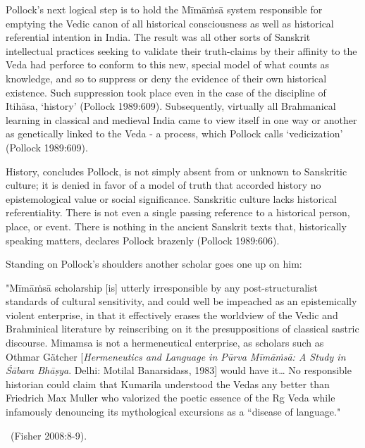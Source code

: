 Pollock’s next logical step is to hold the Mīmāṁsā system responsible for emptying the Vedic canon of all historical consciousness as well as historical referential intention in India. The result was all other sorts of Sanskrit intellectual practices seeking to validate their truth-claims by their affinity to the Veda had perforce to conform to this new, special model of what counts as knowledge, and so to suppress or deny the evidence of their own historical existence. Such suppression took place even in the case of the discipline of Itihāsa, ‘history’ (Pollock 1989:609). Subsequently, virtually all Brahmanical learning in classical and medieval India came to view itself in one way or another as genetically linked to the Veda - a process, which Pollock calls ‘vedicization’ (Pollock 1989:609).

History, concludes Pollock, is not simply absent from or unknown to Sanskritic culture; it is denied in favor of a model of truth that accorded history no epistemological value or social significance. Sanskritic culture lacks historical referentiality. There is not even a single passing reference to a historical person, place, or event. There is nothing in the ancient Sanskrit texts that, historically speaking matters, declares Pollock brazenly (Pollock 1989:606).

Standing on Pollock’s shoulders another scholar goes one up on him:

\begin{myquote}
"Mīmāṁsā scholarship [is] utterly irresponsible by any post-structuralist standards of cultural sensitivity, and could well be impeached as an epistemically violent enterprise, in that it effectively erases the worldview of the Vedic and Brahminical literature by reinscribing on it the presuppositions of classical sastric discourse. Mimamsa is not a hermeneutical enterprise, as scholars such as Othmar Gätcher [\textit{Hermeneutics and Language in Pūrva Mīmāṁsā: A Study in Śābara Bhāṣya}. Delhi: Motilal Banarsidass, 1983] would have it… No responsible historian could claim that Kumarila understood the Vedas any better than Friedrich Max Muller who valorized the poetic essence of the Rg Veda while infamously denouncing its mythological excursions as a “disease of language."

~\hfill (Fisher 2008:8-9).
\end{myquote}


